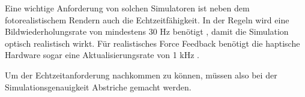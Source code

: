 
Eine wichtige Anforderung von solchen Simulatoren ist neben dem fotorealistischem Rendern auch die Echtzeitfähigkeit. In der Regeln wird eine Bildwiederholungsrate von mindestens 30 Hz benötigt \cite{SimUpdate}, damit die Simulation optisch realistisch wirkt. 
Für realistisches Force Feedback benötigt die haptische Hardware sogar eine Aktualisierungsrate von 1 kHz \cite{SimUpdate}. 

Um der Echtzeitanforderung nachkommen zu können, müssen also bei der Simulationsgenauigkeit Abstriche gemacht werden. %


